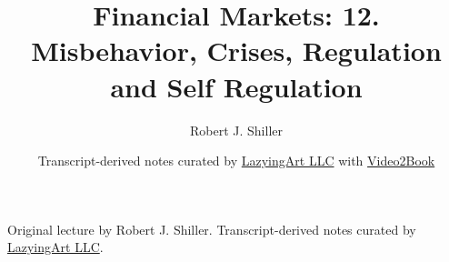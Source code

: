 \documentclass[11pt,oneside]{book}
\begin{document}
\frontmatter
\title{Financial Markets: 12. Misbehavior, Crises, Regulation and Self Regulation}
\author{Robert J. Shiller}
\date{Transcript-derived notes curated by \href{https://lazying.art}{LazyingArt LLC} with \href{https://github.com/lachlanchen/Video2Book}{Video2Book}}
\maketitle
\begin{center}
\small Original lecture by Robert J. Shiller. Transcript-derived notes curated by \href{https://lazying.art}{LazyingArt LLC}.
\end{center}
\clearpage
\mainmatter

\end{document}
